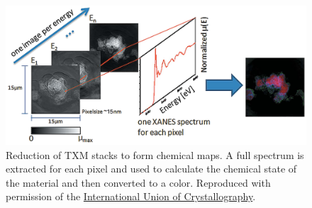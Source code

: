 \documentclass[journal=cmatex,manuscript=perspective]{achemso}
\newcommand{\iucr}{Reproduced with permission of the
  \href{http://journals.iucr.org/}{International Union of
    Crystallography}.}
\begin{document}
\begin{figure}
  \includegraphics[width=\textwidth]{meirer2011-2.png}
  \caption{Reduction of TXM stacks to form chemical maps. A full
    spectrum is extracted for each pixel and used to calculate the
    chemical state of the material and then converted to a
    color.\cite{meirer2011} \iucr}
  \label{figure:meirer2011-2}
\end{figure}
\end{document}
